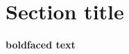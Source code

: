 \documentclass{amsart}
\begin{document}
\section{Section title}

\textbf{boldfaced text}
\end{document}
